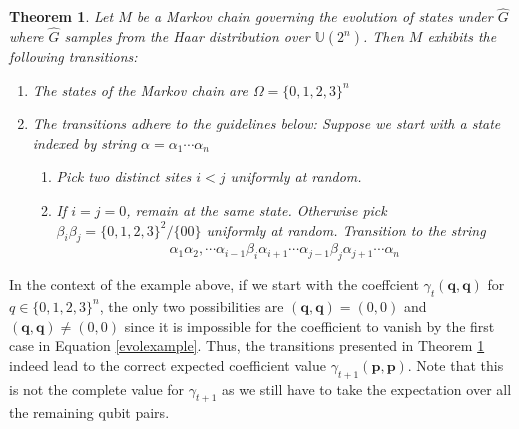 \documentclass[12pt]{amsart}
\newtheorem{theorem}{Theorem}[section]
\theoremstyle{definition}
\theoremstyle{remark}
\numberwithin{equation}{section}
\theoremstyle{remark}
\begin{document}
\begin{theorem} \label{haarevol}
  Let $M$ be a Markov chain governing the evolution of states under $\widehat{G}$ where $\widehat{G}$ samples from the Haar distribution over $\mathbb{U}(2^n)$. Then $M$ exhibits the following transitions:
  \begin{enumerate}
    \item The states of the Markov chain are $\Omega = \{0,1,2,3\}^n$
    \item The transitions adhere to the guidelines below: Suppose we start with a state indexed by string $\alpha = \alpha_1\cdots\alpha_n$
      \begin{enumerate}
        \item Pick two distinct sites $i < j$ uniformly at random.
        \item If $i = j = 0$, remain at the same state. Otherwise pick $\beta_i\beta_j = \{0,1,2,3\}^2/\{00\}$ uniformly at random. Transition to the string
        $$\alpha_1\alpha_2,\cdots\alpha_{i-1}\beta_i\alpha_{i+1}\cdots \alpha_{j-1}\beta_{j}\alpha_{j+1}\cdots\alpha_n$$
      \end{enumerate}
  \end{enumerate}
\end{theorem}
%
In the context of the example above, if we start with the coeffcient $\gamma_t(\textbf{q},\textbf{q})$ for $q \in \{0,1,2,3\}^n$, the only two possibilities are $(\textbf{q},\textbf{q}) = (0,0)$ and $(\textbf{q},\textbf{q}) \neq (0,0)$ since it is impossible for the coefficient to vanish by the first case in Equation \ref{evolexample}. Thus, the transitions presented in Theorem \ref{haarevol} indeed lead to the correct expected coefficient value $\gamma_{t+1}(\textbf{p},\textbf{p})$. Note that this is not the complete value for $\gamma_{t+1}$ as we still have to take the expectation over all the remaining qubit pairs.
\end{document}
